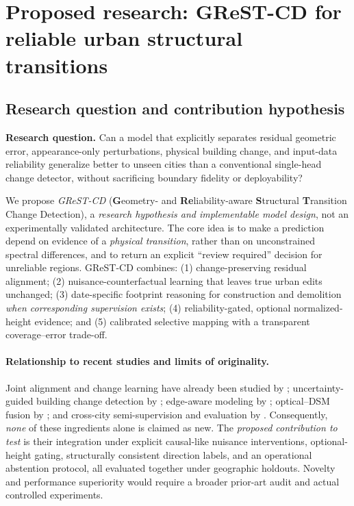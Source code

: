\section{Proposed research: GReST-CD for reliable urban structural transitions}
\label{sec:proposed}

\subsection{Research question and contribution hypothesis}

\textbf{Research question.} Can a model that explicitly separates residual geometric error, appearance-only perturbations, physical building change, and input-data reliability generalize better to unseen cities than a conventional single-head change detector, without sacrificing boundary fidelity or deployability?

We propose \emph{GReST-CD} (\textbf{G}eometry- and \textbf{Re}liability-aware \textbf{S}tructural \textbf{T}ransition Change Detection), a \emph{research hypothesis and implementable model design}, not an experimentally validated architecture. The core idea is to make a prediction depend on evidence of a \emph{physical transition}, rather than on unconstrained spectral differences, and to return an explicit ``review required'' decision for unreliable regions. GReST-CD combines: (1) change-preserving residual alignment; (2) nuisance-counterfactual learning that leaves true urban edits unchanged; (3) date-specific footprint reasoning for construction and demolition \emph{when corresponding supervision exists}; (4) reliability-gated, optional normalized-height evidence; and (5) calibrated selective mapping with a transparent coverage--error trade-off.

\paragraph{Relationship to recent studies and limits of originality.} Joint alignment and change learning have already been studied by \citet{Lu2026}; uncertainty-guided building change detection by \citet{LiUncertainty2025}; edge-aware modeling by \citet{Holail2025}; optical--DSM fusion by \citet{Fu2025}; and cross-city semi-supervision and evaluation by \citet{Srivastava2026}. Consequently, \emph{none} of these ingredients alone is claimed as new. The \emph{proposed contribution to test} is their integration under explicit causal-like nuisance interventions, optional-height gating, structurally consistent direction labels, and an operational abstention protocol, all evaluated together under geographic holdouts. Novelty and performance superiority would require a broader prior-art audit and actual controlled experiments.

